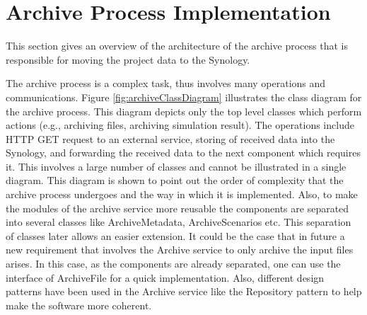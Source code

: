 \section{Archive Process Implementation}
This section gives an overview of the architecture of the archive process that is responsible
for moving the project data to the Synology. 

The archive process is a complex 
task, thus involves many operations and communications. Figure \ref{fig:archiveClassDiagram} illustrates the class diagram for the archive process. This diagram depicts only the top level classes
which perform actions (e.g., archiving files, archiving simulation result). The operations include HTTP GET request to an external service, storing of received
data into the Synology, and forwarding the received data to the next component which requires it. This involves a large number of classes and cannot be 
illustrated in a single diagram. This diagram is shown to point out the order of complexity that the archive process undergoes and the way in which it is
implemented. Also, to make the modules of the archive service more reusable the components are separated into several classes
like ArchiveMetadata, ArchiveScenarios etc. This separation
of classes later allows an easier extension. It could be the case that in future a new requirement
that involves the Archive service to only archive
the input files arises. In this case, as the components are already separated, one can use the interface of ArchiveFile for a quick implementation. 
Also, different design patterns have been used
in the Archive service like the Repository pattern \cite{repo} to help make the software more coherent.
 
